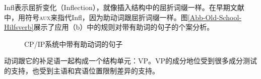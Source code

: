 Infl表示屈折变化（Inflection），就像插入结构中的屈折词缀一样。在早期文献中，用符号\textsc{aux}来指代Infl，因为助动词跟屈折词缀一样。图\vref{Abb-Old-School-Hilfsverb}展示了应用（b）中的规则对带有助词的句子的个案分析。
%
\begin{figure}
\begin{floatrow}
{\caption{\label{Abb-GB-Hilfsverb}CP/IP系统中带有助动词的句子}}
\end{floatrow}
\end{figure}%

动词跟它的补足语一起构成一个结构单元：VP。VP的成分地位受到很多成分测试的支持，也受到主语和宾语位置限制差异的支持。

